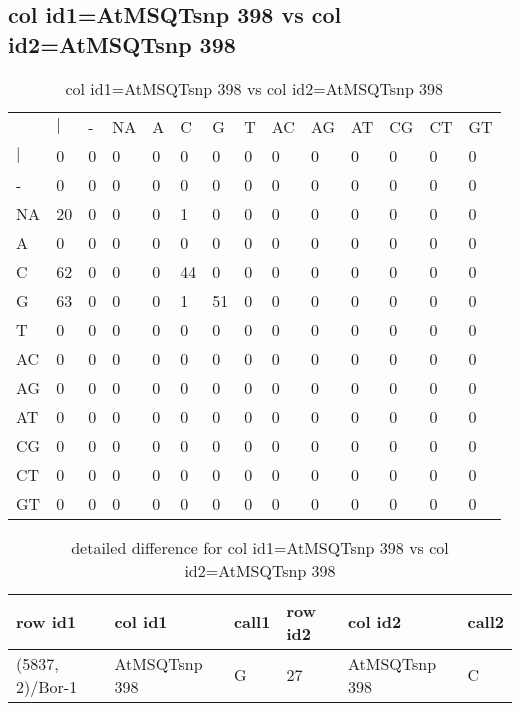 \subsection{col id1=AtMSQTsnp 398 vs col id2=AtMSQTsnp 398}
\begin{center}
\begin{longtable}{|l|l|l|l|l|l|l|l|l|l|l|l|l|l|}
\caption{col id1=AtMSQTsnp 398 vs col id2=AtMSQTsnp 398} \label{table_dm710}\\
\hline
\\
\hline
&$|$&-&NA&A&C&G&T&AC&AG&AT&CG&CT&GT\\
$|$&0&0&0&0&0&0&0&0&0&0&0&0&0\\
-&0&0&0&0&0&0&0&0&0&0&0&0&0\\
NA&20&0&0&0&1&0&0&0&0&0&0&0&0\\
A&0&0&0&0&0&0&0&0&0&0&0&0&0\\
C&62&0&0&0&44&0&0&0&0&0&0&0&0\\
G&63&0&0&0&1&51&0&0&0&0&0&0&0\\
T&0&0&0&0&0&0&0&0&0&0&0&0&0\\
AC&0&0&0&0&0&0&0&0&0&0&0&0&0\\
AG&0&0&0&0&0&0&0&0&0&0&0&0&0\\
AT&0&0&0&0&0&0&0&0&0&0&0&0&0\\
CG&0&0&0&0&0&0&0&0&0&0&0&0&0\\
CT&0&0&0&0&0&0&0&0&0&0&0&0&0\\
GT&0&0&0&0&0&0&0&0&0&0&0&0&0\\
\hline
\end{longtable}
\end{center}

\begin{center}
\begin{longtable}{|l|l|l|l|l|l|}
\caption{detailed difference for col id1=AtMSQTsnp 398 vs col id2=AtMSQTsnp 398} \label{table_dm711}\\
\hline
row id1&col id1&call1&row id2&col id2&call2\\
\hline
(5837, 2)/Bor-1&AtMSQTsnp 398&G&27&AtMSQTsnp 398&C\\
\hline
\end{longtable}
\end{center}


